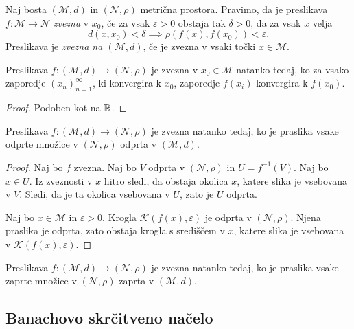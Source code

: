 \documentclass[12pt, a4paper]{article}
\begin{document}
\begin{okvir}
\begin{definicija}
Naj bosta $(\mathcal{M},d)$ in $(\mathcal{N},\rho)$ metrična prostora. Pravimo, da je preslikava $f\colon \mathcal{M}\to \mathcal{N}$ \emph{zvezna} v $x_0$, če za vsak $\varepsilon>0$ obstaja tak $\delta>0$, da za vsak $x$ velja
\[
d(x,x_0)<\delta\implies \rho(f(x),f(x_0))<\varepsilon.
\]
Preslikava je \emph{zvezna na $(\mathcal{M},d)$}, če je zvezna v vsaki točki $x\in \mathcal{M}$.
\end{definicija}
\end{okvir}

\begin{trditev}
Preslikava $f\colon (\mathcal{M},d)\to(\mathcal{N},\rho)$ je zvezna v $x_0\in \mathcal{M}$ natanko tedaj, ko za vsako zaporedje $(x_n)_{n=1}^\infty$, ki konvergira k $x_0$, zaporedje $f(x_i)$ konvergira k $f(x_0)$.
\end{trditev}

\begin{proof}
Podoben kot na $\mathbb{R}$.
\end{proof}

\begin{izrek}
Preslikava $f\colon (\mathcal{M},d)\to(\mathcal{N},\rho)$ je zvezna natanko tedaj, ko je praslika vsake odprte množice v $(\mathcal{N},\rho)$ odprta v $(\mathcal{M},d)$.
\end{izrek}

\begin{proof}
Naj bo $f$ zvezna. Naj bo $V$ odprta v $(\mathcal{N},\rho)$ in $U=f^{-1}(V)$. Naj bo $x\in U$. Iz zveznosti v $x$ hitro sledi, da obstaja okolica $x$, katere slika je vsebovana v $V$. Sledi, da je ta okolica vsebovana v $U$, zato je $U$ odprta.

Naj bo $x\in \mathcal{M}$ in $\varepsilon>0$. Krogla $\mathcal{K}(f(x),\varepsilon)$ je odprta v $(\mathcal{N},\rho)$. Njena praslika je odprta, zato obstaja krogla s središčem v $x$, katere slika je vsebovana v $\mathcal{K}(f(x),\varepsilon)$.
\end{proof}

\begin{posledica}
Preslikava $f\colon (\mathcal{M},d)\to(\mathcal{N},\rho)$ je zvezna natanko tedaj, ko je praslika vsake zaprte množice v $(\mathcal{N},\rho)$ zaprta v $(\mathcal{M},d)$.
\end{posledica}

\newpage

\subsection{Banachovo skrčitveno načelo}
\end{document}
